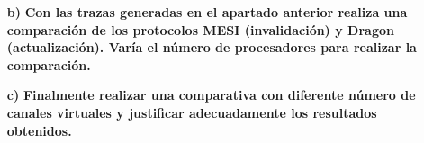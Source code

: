 \begin{itemize}
    \item [\textbf{b)}] \textbf{Con las trazas generadas en el apartado anterior realiza una comparación de los protocolos MESI (invalidación) y Dragon (actualización). Varía el número de procesadores para realizar la comparación.}

    \item[\textbf{c)}] \textbf{Finalmente realizar una comparativa con diferente número de canales virtuales y justificar adecuadamente los resultados obtenidos.} 
    
\end{itemize}